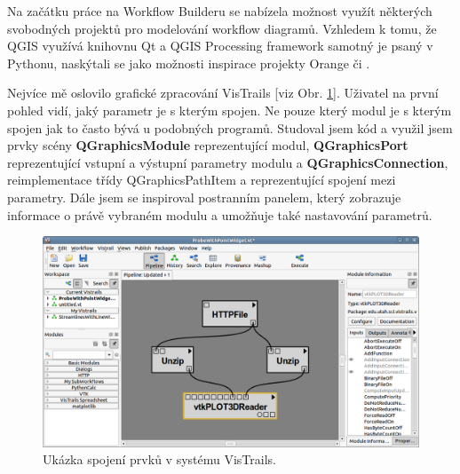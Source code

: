 Na začátku práce na Workflow Builderu se nabízela možnost využít některých svobodných projektů pro modelování workflow diagramů. Vzhledem k tomu, že QGIS využívá knihovnu Qt a QGIS Processing framework samotný je psaný  v Pythonu, naskýtali se jako možnosti inspirace projekty Orange či .

Nejvíce mě oslovilo grafické zpracování VisTrails [viz Obr. \ref{vt}]. Uživatel na první pohled vidí, jaký parametr je s kterým spojen. Ne pouze který modul je s kterým spojen jak to často bývá u podobných programů. Studoval jsem kód a využil jsem prvky scény \textbf{QGraphicsModule} reprezentující modul, \textbf{QGraphicsPort} reprezentující vstupní a výstupní parametry modulu a \textbf{QGraphicsConnection}, reimplementace třídy QGraphicsPathItem a  reprezentující spojení mezi parametry. Dále jsem se inspiroval postranním panelem, který zobrazuje informace o právě vybraném modulu a umožňuje také nastavování parametrů.

\newpage

\begin{figure}[h]
	\centering
	\includegraphics[scale=0.5]{pictures/qt/vt}
	\caption{Ukázka spojení prvků v systému VisTrails.}
	\label{vt}
\end{figure}

